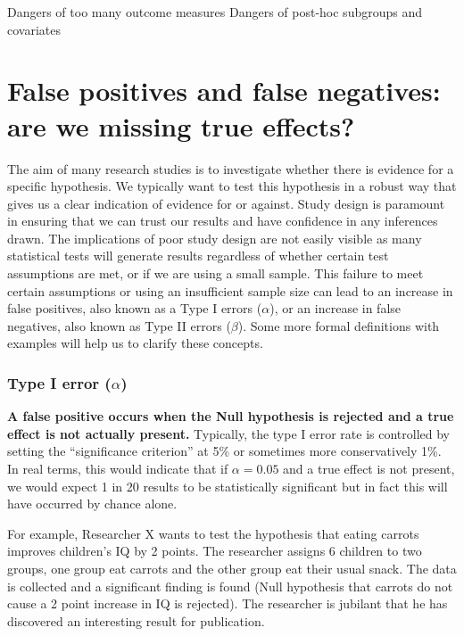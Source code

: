 \documentclass[]{book}
\begin{document}
Dangers of too many outcome measures
Dangers of post-hoc subgroups and covariates

\hypertarget{false-positives-and-false-negatives-are-we-missing-true-effects}{%
\chapter{False positives and false negatives: are we missing true effects?}\label{false-positives-and-false-negatives-are-we-missing-true-effects}}

The aim of many research studies is to investigate whether there is evidence for a specific hypothesis. We typically want to test this hypothesis in a robust way that gives us a clear indication of evidence for or against. Study design is paramount in ensuring that we can trust our results and have confidence in any inferences drawn. The implications of poor study design are not easily visible as many statistical tests will generate results regardless of whether certain test assumptions are met, or if we are using a small sample. This failure to meet certain assumptions or using an insufficient sample size can lead to an increase in false positives, also known as a Type I errors (\(\alpha\)), or an increase in false negatives, also known as Type II errors (\(\beta\)). Some more formal definitions with examples will help us to clarify these concepts.

\hypertarget{type-i-error-alpha}{%
\subsection{\texorpdfstring{Type I error (\(\alpha\))}{Type I error (\textbackslash{}alpha)}}\label{type-i-error-alpha}}

\textbf{A false positive occurs when the Null hypothesis is rejected and a true effect is not actually present.} Typically, the type I error rate is controlled by setting the ``significance criterion'' at 5\% or sometimes more conservatively 1\%. In real terms, this would indicate that if \(\alpha=0.05\) and a true effect is not present, we would expect 1 in 20 results to be statistically significant but in fact this will have occurred by chance alone.

For example, Researcher X wants to test the hypothesis that eating carrots improves children's IQ by 2 points. The researcher assigns 6 children to two groups, one group eat carrots and the other group eat their usual snack. The data is collected and a significant finding is found (Null hypothesis that carrots do not cause a 2 point increase in IQ is rejected). The researcher is jubilant that he has discovered an interesting result for publication.
\end{document}
